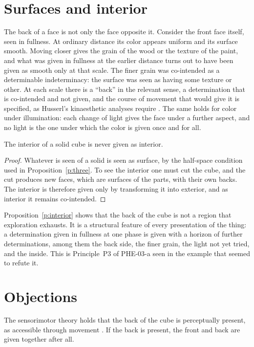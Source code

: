 \documentclass{situationist-preprint}
\begin{document}
\section{Surfaces and interior}

The back of a face is not only the face opposite it. Consider the front face itself, seen in fullness. At ordinary distance its color appears uniform and its surface smooth. Moving closer gives the grain of the wood or the texture of the paint, and what was given in fullness at the earlier distance turns out to have been given as smooth only at that scale. The finer grain was co-intended as a determinable indeterminacy: the surface was seen as having some texture or other. At each scale there is a \enquote{back} in the relevant sense, a determination that is co-intended and not given, and the course of movement that would give it is specified, as Husserl's kinaesthetic analyses require \citep{Husserl1973}. The same holds for color under illumination: each change of light gives the face under a further aspect, and no light is the one under which the color is given once and for all.

\begin{proposition}\label{p:interior}
The interior of a solid cube is never given as interior.
\end{proposition}

\begin{proof}
Whatever is seen of a solid is seen as surface, by the half-space condition used in Proposition~\ref{p:three}. To see the interior one must cut the cube, and the cut produces new faces, which are surfaces of the parts, with their own backs. The interior is therefore given only by transforming it into exterior, and as interior it remains co-intended.
\end{proof}

Proposition~\ref{p:interior} shows that the back of the cube is not a region that exploration exhausts. It is a structural feature of every presentation of the thing: a determination given in fullness at one phase is given with a horizon of further determinations, among them the back side, the finer grain, the light not yet tried, and the inside. This is Principle~P3 of PHE-03-a seen in the example that seemed to refute it.

\section{Objections}

\begin{objection}
The sensorimotor theory holds that the back of the cube is perceptually present, as accessible through movement \citep{Noe2004}. If the back is present, the front and back are given together after all.
\end{objection}
\end{document}
